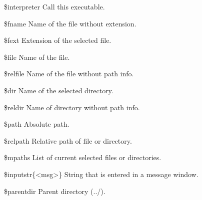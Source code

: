 
%
\begin{codeentry}
\item[\$interpreter] Call this executable.              %
\item[\$fname] Name of the file without extension.      %
\item[\$fext] Extension of the selected file.           %
\item[\$file] Name of the file.                         %
\item[\$relfile] Name of the file without path info.    %
\item[\$dir] Name of the selected directory.            %
\item[\$reldir] Name of directory without path info.    %
\item[\$path] Absolute path.                            %
\item[\$relpath] Relative path of file or directory.    %
\item[\$mpaths] List of current selected files or directories. %
\item[\$inputstr\{<msg>\}] String that is entered in a message window. %
\item[\$parentdir] Parent directory (../).              %
\end{codeentry}

%
%
%
%
%
